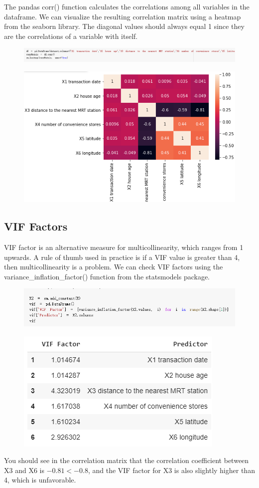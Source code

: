\documentclass{article}
\begin{document}
The pandas corr() function calculates the correlations among all variables in the dataframe. We can visualize the resulting correlation matrix using a heatmap from the seaborn library. The diagonal values should always equal 1 since they are the correlations of a variable with itself.
\begin{figure}[H]\includegraphics[width=1.1\linewidth]{8}\end{figure}
\begin{figure}[H]\includegraphics[width=0.9\linewidth]{9}\end{figure}
\subsection*{VIF Factors}
VIF factor is an alternative measure for multicollinearity, which ranges from 1 upwards. A rule of thumb used in practice is if a VIF value is greater than 4, then multicollinearity is a problem. We can check VIF factors using the variance\_inflation\_factor() function from the statsmodels package.
\begin{figure}[H]\includegraphics[width=\linewidth]{10}\end{figure}
\begin{figure}[H]\centering\includegraphics[width=0.5\linewidth]{11}\end{figure}
You should see in the correlation matrix that the correlation coefficient between X3 and X6 is $-0.81 < -0.8$, and the VIF factor for X3 is also slightly higher than 4, which is unfavorable.
\end{document}
